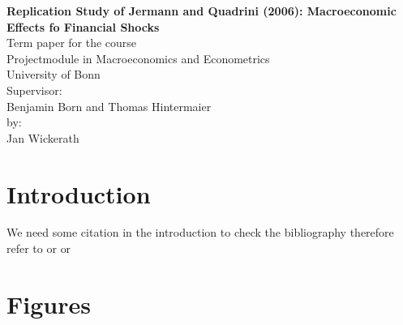 \documentclass[a4paper,12pt,titlepage]{article}
\begin{document}
\begin{titlepage}
\begin{center}

\textbf{\Huge Replication Study of Jermann and Quadrini (2006): Macroeconomic
  Effects fo Financial Shocks}
\\[5cm]
\Large 
Term paper for the course\\
Projectmodule in Macroeconomics and Econometrics\\
University of Bonn\\
\vfill
Supervisor: \\
Benjamin Born and Thomas Hintermaier\\[2cm]

by:\\
Jan Wickerath\\


\end{center}
\end{titlepage}

\thispagestyle{empty}
\tableofcontents

\newpage

\setcounter{page}{1}

\thispagestyle{empty}

\section{Introduction}
\label{sec:intro}

We need some citation in the introduction to check the bibliography therefore
refer to \cite{Eggertsson_Krugman_QJE2012} or
\textcite{Eggertsson_Krugman_QJE2012} or \parencite{Eggertsson_Krugman_QJE2012}
% 
% 
% 
% 
% 
\newpage

\appendix


\section{Figures}

\newpage
\printbibliography
% 
% 
\end{document}
